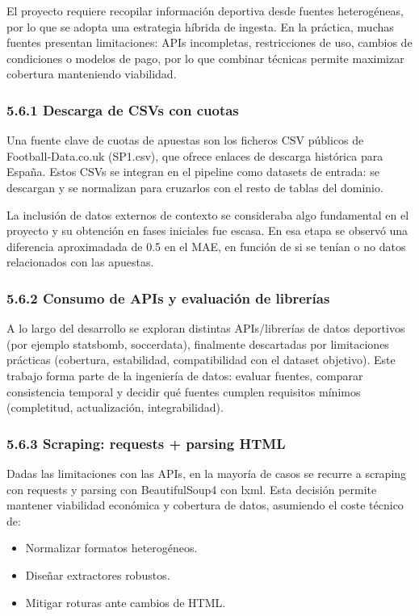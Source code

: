 El proyecto requiere recopilar información deportiva desde fuentes heterogéneas, por lo que se adopta 
una estrategia híbrida de ingesta. En la práctica, muchas fuentes presentan limitaciones: APIs 
incompletas, restricciones de uso, cambios de condiciones o modelos de pago, por lo que combinar 
técnicas permite maximizar cobertura manteniendo viabilidad.

\subsubsection{5.6.1 Descarga de CSVs con cuotas}

Una fuente clave de cuotas de apuestas son los ficheros CSV públicos de Football‑Data.co.uk 
(SP1.csv), que ofrece enlaces de descarga histórica para España. Estos CSVs se integran en el 
pipeline como datasets de entrada: se descargan y se normalizan para cruzarlos con el resto de 
tablas del dominio.

La inclusión de datos externos de contexto se consideraba algo fundamental en el proyecto y su obtención
en fases iniciales fue escasa. En esa etapa se observó una diferencia aproximadada de 0.5 en el MAE, en función de si 
se tenían o no datos relacionados con las apuestas.

\subsubsection{5.6.2 Consumo de APIs y evaluación de librerías}

A lo largo del desarrollo se exploran distintas APIs/librerías de datos deportivos (por ejemplo 
statsbomb, soccerdata), finalmente descartadas por limitaciones prácticas (cobertura, 
estabilidad, compatibilidad con el dataset objetivo). Este trabajo forma parte de la ingeniería de 
datos: evaluar fuentes, comparar consistencia temporal y decidir qué fuentes cumplen requisitos 
mínimos (completitud, actualización, integrabilidad).

\subsubsection{5.6.3 Scraping: requests + parsing HTML}

Dadas las limitaciones con las APIs, en la mayoría de casos se recurre a scraping con requests y 
parsing con BeautifulSoup4 con lxml. Esta decisión permite mantener viabilidad económica y cobertura 
de datos, asumiendo el coste técnico de:

\begin{itemize}
\item Normalizar formatos heterogéneos.
\item Diseñar extractores robustos.
\item Mitigar roturas ante cambios de HTML.
\end{itemize}

